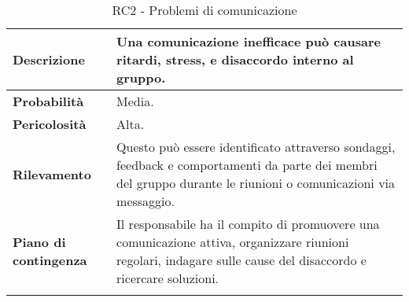 \begin{longtable}{ | l | p{10cm} | }
    \hline
    \textbf{Descrizione} & Una comunicazione inefficace può causare ritardi, stress, e disaccordo interno al gruppo. \\
    \hline
    \textbf{Probabilità} & Media. \\
    \hline
    \textbf{Pericolosità} & Alta. \\
    \hline
    \textbf{Rilevamento} & Questo può essere identificato attraverso sondaggi, feedback e comportamenti da parte dei membri del gruppo durante le riunioni o comunicazioni via messaggio. \\
    \hline
    \textbf{Piano di contingenza} & Il responsabile ha il compito di promuovere una comunicazione attiva, organizzare riunioni regolari, indagare sulle cause del disaccordo e ricercare soluzioni. \\
    \hline
    \caption{RC2 - Problemi di comunicazione}
    \label{table:9}
\end{longtable}